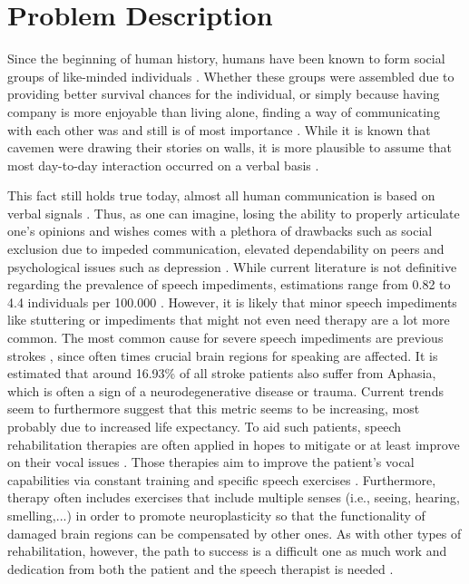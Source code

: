 \documentclass[draft,final]{vutinfth} %
\begin{document}
\section{Problem Description}
Since the beginning of human history, humans have been known to form social groups of like-minded individuals \cite{bentley2022prehistory}. Whether these groups were assembled due to providing better survival chances for the individual, or simply because having company is more enjoyable than living alone, finding a way of communicating with each other was and still is of most importance \cite{kelly2015knowledge}. While it is known that cavemen were drawing their stories on walls, it is more plausible to assume that most day-to-day interaction occurred on a verbal basis \cite{singleton2011communication}. 

This fact still holds true today, almost all human communication is based on verbal signals \cite{salim2023verbal}. Thus, as one can imagine, losing the ability to properly articulate one's opinions and wishes comes with a plethora of drawbacks such as social exclusion due to impeded communication, elevated dependability on peers and psychological issues such as depression \cite{hilari2010psychological}. While current literature is not definitive regarding the prevalence of speech impediments, estimations range from 0.82 to 4.4 individuals per 100.000 \cite{swain2018congenital, duffy2021primary}. However, it is likely that minor speech impediments like stuttering or impediments that might not even need therapy are a lot more common. The most common cause for severe speech impediments are previous strokes \cite{wu2020prevalence}, since often times crucial brain regions for speaking are affected. It is estimated that around 16.93\% of all stroke patients also suffer from Aphasia, which is often a sign of a neurodegenerative disease or trauma. Current trends seem to furthermore suggest that this metric seems to be increasing, most probably due to increased life expectancy.
To aid such patients, speech rehabilitation therapies are often applied in hopes to mitigate or at least improve on their vocal issues \cite{stahl2018efficacy}. Those therapies aim to improve the patient's vocal capabilities via constant training and specific speech exercises \cite{proestler2023}. Furthermore, therapy often includes exercises that include multiple senses (i.e., seeing, hearing, smelling,...) in order to promote neuroplasticity so that the functionality of damaged brain regions can be compensated by other ones. As with other types of rehabilitation, however, the path to success is a difficult one as much work and dedication from both the patient and the speech therapist is needed \cite{musicco2003early}.
\end{document}
